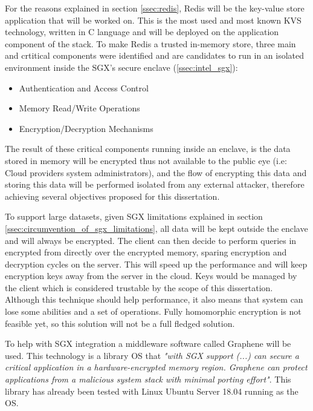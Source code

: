 For the reasons explained in section \ref{ssec:redis}, Redis will be the key-value store application that will be worked on. This is the most used and most known \gls{KVS} technology, written in C language and will be deployed on the application component of the stack. To make Redis a trusted in-memory store, three main and crtitical components were identified and are candidates to run in an isolated environment inside the \gls{SGX}'s secure enclave (\ref{ssec:intel_sgx}):

\begin{itemize}
	\item Authentication and Access Control
	\item Memory Read/Write Operations
	\item Encryption/Decryption Mechanisms
\end{itemize}

The result of these critical components running inside an enclave, is the data stored in memory will be encrypted thus not available to the public eye (i.e: Cloud providers system administrators), and the flow of encrypting this data and storing this data will be performed isolated from any external attacker, therefore achieving several objectives proposed for this dissertation.

To support large datasets, given \gls{SGX} limitations explained in section \ref{ssec:circumvention_of_sgx_limitations}, all data will be kept outside the enclave and will always be encrypted. The client can then decide to perform queries in encrypted from directly over the encrypted memory, sparing encryption and decryption cycles on the server. This will speed up the performance and will keep encryption keys away from the server in the cloud. Keys would be managed by the client which is considered trustable by the scope of this dissertation. Although this technique should help performance, it also means that system can lose some abilities and a set of operations. Fully homomorphic encryption is not feasible yet, so this solution will not be a full fledged solution.

To help with \gls{SGX} integration a middleware software called Graphene \cite{graphene:1} will be used. This technology is a library \gls{OS} that \textit{"with \gls{SGX} support (...) can secure a critical application in a hardware-encrypted memory region. Graphene can protect applications from a malicious system stack with minimal porting effort"}. This library has already been tested with Linux Ubuntu Server 18.04 running as the \gls{OS}.

